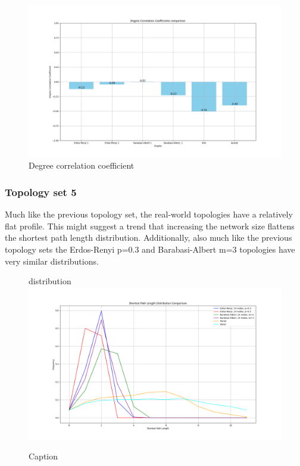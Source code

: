 \begin{figure}
    \centering
    \includegraphics[width=0.9\linewidth]{images/FINAL-TOPO-COMP/Degree-correlation-coeff/deg-coeff-23.png}
    \caption{Degree correlation coefficient}
    \label{fig:enter-label}
\end{figure}

\subsubsection{Topology set 5}
Much like the previous topology set, the real-world topologies have a relatively flat profile. This might suggest a trend that increasing the network size flattens the shortest path length distribution. Additionally, also much like the previous topology sets the Erdos-Renyi p=0.3 and Barabasi-Albert m=3 topologies have very similar distributions. 
\begin{figure}
    \centering
    distribution \includegraphics[width=0.9\linewidth]{images/FINAL-TOPO-COMP/line-24.png}
    \caption{Caption}
    \label{fig:enter-label}
\end{figure}

